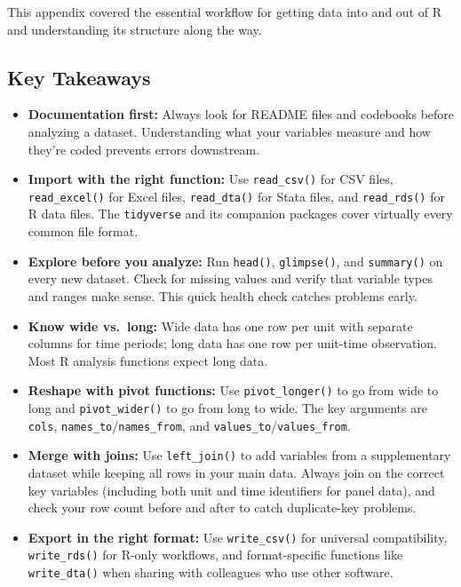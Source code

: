 \documentclass[
  letterpaper,
  DIV=11,
  numbers=noendperiod]{scrreprt}
\begin{document}
This appendix covered the essential workflow for getting data into and
out of R and understanding its structure along the way.

\subsection{Key Takeaways}\label{key-takeaways-6}

\begin{itemize}
\item
  \textbf{Documentation first:} Always look for README files and
  codebooks before analyzing a dataset. Understanding what your
  variables measure and how they're coded prevents errors downstream.
\item
  \textbf{Import with the right function:} Use \texttt{read\_csv()} for
  CSV files, \texttt{read\_excel()} for Excel files,
  \texttt{read\_dta()} for Stata files, and \texttt{read\_rds()} for R
  data files. The \texttt{tidyverse} and its companion packages cover
  virtually every common file format.
\item
  \textbf{Explore before you analyze:} Run \texttt{head()},
  \texttt{glimpse()}, and \texttt{summary()} on every new dataset. Check
  for missing values and verify that variable types and ranges make
  sense. This quick health check catches problems early.
\item
  \textbf{Know wide vs.~long:} Wide data has one row per unit with
  separate columns for time periods; long data has one row per unit-time
  observation. Most R analysis functions expect long data.
\item
  \textbf{Reshape with pivot functions:} Use \texttt{pivot\_longer()} to
  go from wide to long and \texttt{pivot\_wider()} to go from long to
  wide. The key arguments are \texttt{cols},
  \texttt{names\_to}/\texttt{names\_from}, and
  \texttt{values\_to}/\texttt{values\_from}.
\item
  \textbf{Merge with joins:} Use \texttt{left\_join()} to add variables
  from a supplementary dataset while keeping all rows in your main data.
  Always join on the correct key variables (including both unit and time
  identifiers for panel data), and check your row count before and after
  to catch duplicate-key problems.
\item
  \textbf{Export in the right format:} Use \texttt{write\_csv()} for
  universal compatibility, \texttt{write\_rds()} for R-only workflows,
  and format-specific functions like \texttt{write\_dta()} when sharing
  with colleagues who use other software.
\end{itemize}
\end{document}
